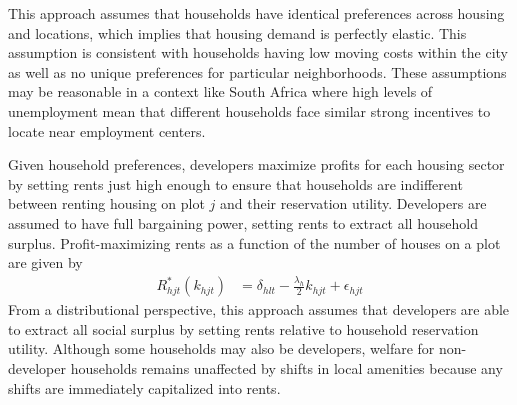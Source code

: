 \documentclass[12pt]{article}
\begin{document}
This approach assumes that households have identical preferences across housing and locations, which implies that housing demand is perfectly elastic.  This assumption is consistent with households having low moving costs within the city as well as no unique preferences for particular neighborhoods.  These assumptions may be reasonable in a context like South Africa where high levels of unemployment mean that different households face similar strong incentives to locate near employment centers.


Given household preferences, developers maximize profits for each housing sector by setting rents just high enough to ensure that households are indifferent between renting housing on plot $j$ and their reservation utility.  Developers are assumed to have full bargaining power, setting rents to extract all household surplus.  Profit-maximizing rents as a function of the number of houses on a plot are given by
\begin{align*}
R_{hjt}^{*}(k_{hjt}) &= \delta_{hlt} - \frac{\lambda_h}{2} k_{hjt} + \epsilon_{hjt}
\end{align*}
From a distributional perspective, this approach assumes that developers are able to extract all social surplus by setting rents relative to household reservation utility.  Although some households may also be developers, welfare for non-developer households remains unaffected by shifts in local amenities because any shifts are immediately capitalized into rents. %
\end{document}
